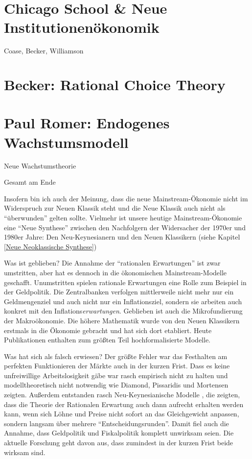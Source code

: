 \section{Chicago School \& Neue Institutionenökonomik}
Coase, Becker, Williamson 

\section{Becker: Rational Choice Theory}




\section{Paul Romer: Endogenes Wachstumsmodell} Neue Wachstumstheorie









Gesamt am Ende



Insofern bin ich auch der Meinung, dass die neue Mainstream-Ökonomie nicht im Widerspruch zur Neuen Klassik steht und die Neue Klassik auch nicht als "`überwunden"' gelten sollte. Vielmehr ist unsere heutige Mainstream-Ökonomie eine "`Neue Synthese"' zwischen den Nachfolgern der Widersacher der 1970er und 1980er Jahre: Den Neu-Keynesianern und den Neuen Klassikern (siehe Kapitel \ref{Neue Neoklassische Synthese})


Was ist geblieben? Die Annahme der "`rationalen Erwartungen"' ist zwar umstritten, aber hat es dennoch in die ökonomischen Mainstream-Modelle geschafft. Unumstritten spielen rationale Erwartungen eine Rolle zum Beispiel in der Geldpolitik. Die Zentralbanken verfolgen mittlerweile nicht mehr nur ein Geldmengenziel und auch nicht nur ein Inflationsziel, sondern sie arbeiten auch konkret mit den Inflations\textit{erwartungen}.
Geblieben ist auch die Mikrofundierung der Makroökonomie. Die höhere Mathematik wurde von den Neuen Klassikern erstmals in die Ökonomie gebracht und hat sich dort etabliert. Heute Publikationen enthalten zum größten Teil hochformalisierte Modelle.

Was hat sich als falsch erwiesen? Der größte Fehler war das Festhalten am perfekten Funktionieren der Märkte auch in der kurzen Frist. Dass es keine unfreiwillige Arbeitslosigkeit gäbe war rasch empirisch nicht zu halten und modelltheoretisch nicht notwendig wie Diamond, Pissaridis und Mortensen zeigten. Außerdem entstanden rasch Neu-Keynesianische Modelle , die zeigten, dass die Theorie der Rationalen Erwartung auch dann aufrecht erhalten werden kann, wenn sich Löhne und Preise nicht sofort an das Gleichgewicht anpassen, sondern langsam über mehrere "`Entscheidungsrunden"'. Damit fiel auch die Annahme, dass Geldpolitik und Fiskalpolitik komplett unwirksam seien. Die aktuelle Forschung geht davon aus, dass zumindest in der kurzen Frist beide wirksam sind.





